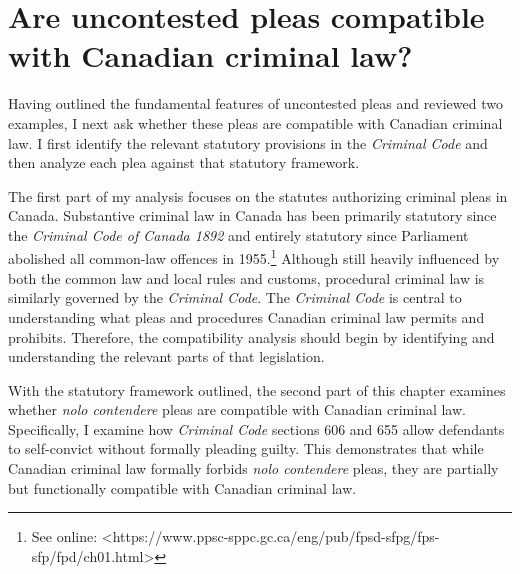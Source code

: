\chapter{Are uncontested pleas compatible with Canadian criminal law?}
Having outlined the fundamental features of uncontested pleas and reviewed two examples, I next ask whether these pleas are compatible with Canadian criminal law. I first identify the relevant statutory provisions in the \textit{Criminal Code} and then analyze each plea against that statutory framework.

The first part of my analysis focuses on the statutes authorizing criminal pleas in Canada. Substantive criminal law in Canada has been primarily statutory since the \textit{Criminal Code of Canada 1892} and entirely statutory since Parliament abolished all common-law offences in 1955.\footnote{See online: \textless https://www.ppsc-sppc.gc.ca/eng/pub/fpsd-sfpg/fps-sfp/fpd/ch01.html\textgreater} Although still heavily influenced by both the common law and local rules and customs, procedural criminal law is similarly governed by the \textit{Criminal Code}. The \textit{Criminal Code} is central to understanding what pleas and procedures Canadian criminal law permits and prohibits. Therefore, the compatibility analysis should begin by identifying and understanding the relevant parts of that legislation. 

With the statutory framework outlined, the second part of this chapter examines whether \textit{nolo contendere} pleas are compatible with Canadian criminal law. Specifically, I examine how \textit{Criminal Code} sections 606 and 655 allow defendants to self-convict without formally pleading guilty. This demonstrates that while Canadian criminal law formally forbids \textit{nolo contendere} pleas, they are partially but functionally compatible with Canadian criminal law.